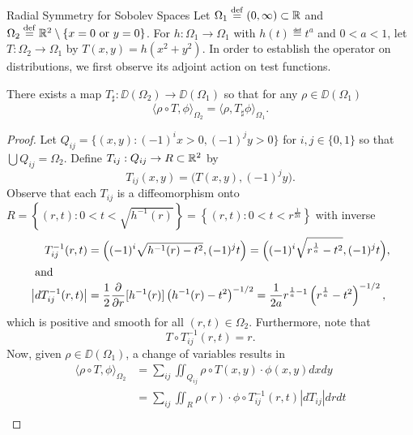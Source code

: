 \begin{chapter}{Radial Symmetry for Sobolev Spaces}
Let $\Omega_1 \stackrel{\rm def}{=} (0,\infty) \subset \mathbb R$ and $\Omega_2 \stackrel{\rm def}{=} \mathbb R^2 \setminus \{x = 0\text{ or }y=0\}$.
For $h:\Omega_1\to\Omega_1$ with $h(t) \eqdef t^a$ and $0<a<1$, let $T:\Omega_2 \to \Omega_1$ by $T(x,y) = h(x^2 + y^2)$.
In order to establish the operator on distributions, we first observe its adjoint action on test functions.
\begin{lem} \label{lem:existence}
  There exists a map $T_{\sharp}:\DD(\Omega_2) \to \DD(\Omega_1)$ so that for any $\rho \in \DD(\Omega_1)$
  \begin{equation}
    \langle \rho \circ T, \phi \rangle_{\Omega_2} = \langle \rho, T_\sharp \phi\rangle_{\Omega_1}.
  \end{equation}
\end{lem}
\begin{proof}
  Let $Q_{ij} = \{ (x,y): (-1)^i x>0, (-1)^jy>0\}$ for $i,j \in \{0,1\}$ so that $\bigcup Q_{ij} = \Omega_2$.
  Define $T_{ij}:Q_{ij} \to R\subset \mathbb R^2$ by 
  \begin{equation}
    T_{ij}(x,y) = \Big(T(x,y), (-1)^jy\Big). 
  \end{equation}
  Observe that each $T_{ij}$ is a diffeomorphism onto $R = \left\{(r,t): 0 < t < \sqrt{h^{-1}(r)}\right\} = \left\{(r,t): 0 < t < r^{\frac{1}{2a}}\right\}$ with inverse 
  \begin{align}
    T_{ij}^{-1}(r,t) 
      &= \Big((-1)^i\sqrt{h^{-1}(r) - t^2}, (-1)^jt\Big) = \Big((-1)^i\sqrt{r^{\frac 1a} - t^2}, (-1)^jt\Big),\\
    \intertext{ and }
    \left|dT_{ij}^{-1}(r,t)\right| 
      &= \frac12 \frac{\partial}{\partial r}[h^{-1}(r)]\left(h^{-1}(r) - t^2\right)^{-1/2} = \frac{1}{2a} r^{\frac 1a-1}\left(r^{\frac 1a} - t^2\right)^{-1/2}, \label{eq:determinant}
  \end{align}
  which is positive and smooth for all $(r,t)\in \Omega_2$.
  Furthermore, note that 
  \begin{equation}
    T \circ T_{ij}^{-1}(r,t) = r. \label{eq:partialInverseT}
  \end{equation}
  Now, given $\rho \in \DD(\Omega_1)$, a change of variables results in
  \begin{align}
    \langle \rho \circ T, \phi\rangle_{\Omega_2} 
    &= \sum_{ij}\iint_{Q_{ij}} \rho\circ T(x,y)\cdot \phi(x,y)dxdy \nonumber \\
    &= \sum_{ij}\iint_{R} \rho(r)\cdot  \phi \circ T_{ij}^{-1}(r,t)\left|dT_{ij}\right|drdt \nonumber \\

\end{align}
\end{proof}
\end{chapter}
